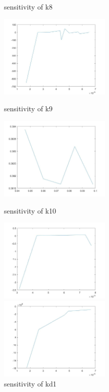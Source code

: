 \begin{figure}
\begin{varwidth}[t]{\textwidth}
	\end{varwidth}
	\caption{sensitivity of k8}
	\begin{varwidth}[t]{\textwidth}
		\vspace{0pt}
		\includegraphics[height=4cm]{s9.jpg}
	\end{varwidth}
	\caption{sensitivity of k9}
	\begin{varwidth}[t]{\textwidth}
		\vspace{0pt}
		\includegraphics[height=4cm]{s10.jpg}
	\end{varwidth}
	\caption{sensitivity of k10}
	\begin{varwidth}[t]{\textwidth}
		\vspace{0pt}
		\includegraphics[height=4cm]{sd1.jpg}
	\end{varwidth}
	\caption{sensitivity of kd1}
	\begin{varwidth}[t]{\textwidth}
		\vspace{0pt}
		\includegraphics[height=4cm]{sd2.jpg}

\end{varwidth}
\end{figure}
